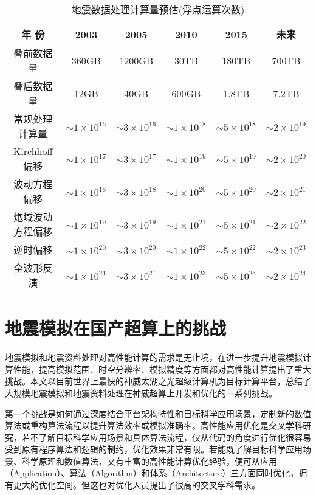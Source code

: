 \begin{table}[ht]
\centering
\caption{地震数据处理计算量预估(浮点运算次数)}
\label{tb:oilcomputing}
\begin{tabular}{cccccc}
\hline\hline
年    份      & 2003         & 2005         & 2010         & 2015         & 未来           \\ \hline
叠前数据量       & 360GB        & 1200GB       & 30TB         & 180TB        & 700TB        \\ \hline
叠后数据量       & 12GB         & 40GB         & 600GB        & 1.8TB        & 7.2TB        \\ \hline
常规处理计算量   & $\sim1\times10^{16}$ & $\sim3\times10^{16}$ & $\sim1\times10^{18}$ & $\sim5\times10^{18}$ & $\sim2\times10^{19}$ \\ \hline
Kirchhoff偏移    & $\sim1\times10^{17}$ & $\sim3\times10^{17}$ & $\sim1\times10^{19}$ & $\sim5\times10^{19}$ & $\sim2\times10^{20}$ \\ \hline
波动方程偏移     & $\sim1\times10^{18}$ & $\sim3\times10^{18}$ & $\sim1\times10^{20}$ & $\sim5\times10^{20}$ & $\sim2\times10^{21}$ \\ \hline
炮域波动方程偏移 & $\sim1\times10^{19}$ & $\sim3\times10^{19}$ & $\sim1\times10^{21}$ & $\sim5\times10^{21}$ & $\sim2\times10^{22}$ \\ \hline
逆时偏移         & $\sim1\times10^{20}$ & $\sim3\times10^{20}$ & $\sim1\times10^{22}$ & $\sim5\times10^{22}$ & $\sim2\times10^{23}$ \\ \hline
全波形反演       & $\sim1\times10^{21}$ & $\sim3\times10^{21}$ & $\sim1\times10^{23}$ & $\sim5\times10^{23}$ & $\sim2\times10^{24}$ \\ \hline
\hline
\end{tabular}
\end{table}

\section{地震模拟在国产超算上的挑战}

地震模拟和地震资料处理对高性能计算的需求是无止境，在进一步提升地震模拟计算性能，提高模拟范围、时空分辨率、模拟精度等方面都对高性能计算提出了重大挑战。本文以目前世界上最快的神威太湖之光超级计算机为目标计算平台，总结了大规模地震模拟和地震资料处理在神威超算上开发和优化的一系列挑战。

第一个挑战是如何通过深度结合平台架构特性和目标科学应用场景，定制新的数值算法或重构算法流程以提升算法效率或模拟准确率。高性能应用优化是交叉学科研究，若不了解目标科学应用场景和具体算法流程，仅从代码的角度进行优化很容易受到原有程序算法和逻辑的制约，优化效果非常有限。若能既了解目标科学应用场景、科学原理和数值算法，又有丰富的高性能计算优化经验，便可从应用（Application）、算法（Algorithm）和体系（Architecture）三方面同时优化，拥有更大的优化空间。但这也对优化人员提出了很高的交叉学科需求。

